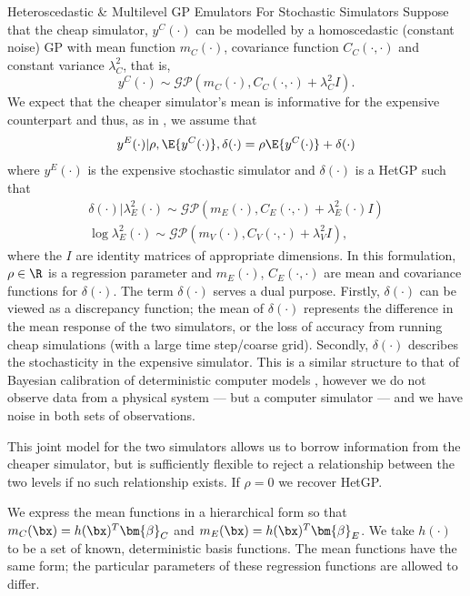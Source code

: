 \begin{chapter}{Heteroscedastic \& Multilevel GP Emulators For Stochastic Simulators\label{Ch:Hetsml}}
Suppose that the cheap simulator, $y^C(\cdot)$ can be modelled by a homoscedastic (constant noise) GP with mean function $m_C(\cdot)$, covariance function $C_C(\cdot, \cdot)$ and constant variance $\lambda^2_C$, that is,
\begin{equation}
	y^C(\cdot) \sim \mathcal{GP} \left( m_C(\cdot), C_C(\cdot, \cdot) + \lambda^2_C  I\right).
\end{equation}
We expect that the cheaper simulator's mean is informative for the expensive counterpart and thus, as in \cite{Kennedy2000}, we assume that
\begin{equation}
	y^E(\cdot)|\rho, \E\{y^C(\cdot)\}, \delta(\cdot) = \rho \E\{ y^C(\cdot) \} + \delta(\cdot)
\end{equation}
where $y^E (\cdot)$ is the expensive stochastic simulator and $\delta(\cdot)$ is a HetGP such that
\begin{align}
	\delta(\cdot)|\lambda_E^2 (\cdot) \sim \mathcal{GP}\left( m_E(\cdot), C_E(\cdot, \cdot) + \lambda^2_E(\cdot)I \right) \\
\log \lambda^2_E(\cdot) \sim \mathcal{GP} \left( m_V(\cdot), C_V (\cdot, \cdot) + \lambda_{V}^2 I \right),
\end{align}
where the $I$ are identity matrices of appropriate dimensions.
In this formulation, $\rho \in \R$ is a regression parameter and $m_E(\cdot)$, $C_E(\cdot, \cdot)$ are mean and covariance functions for $\delta(\cdot)$. The term $\delta(\cdot)$ serves a dual purpose. Firstly, $\delta(\cdot)$ can be viewed as a discrepancy function; the mean of $\delta(\cdot)$ represents the difference in the mean response of the two simulators, or the loss of accuracy from running cheap simulations (with a large time step/coarse grid). Secondly, $\delta(\cdot)$ describes the stochasticity in the expensive simulator. This is a similar structure to that of Bayesian calibration of deterministic computer models \citep{Ohagan01}, however we do not observe data from a physical system --- but a computer simulator --- and we have noise in both sets of observations.

This joint model for the two simulators allows us to borrow information from the cheaper simulator, but is sufficiently flexible to reject a relationship between the two levels if no such relationship exists. If $\rho = 0$ we recover HetGP.

We express the mean functions in a hierarchical form so that	$m_C(\bx) = h(\bx)^T \bm{\beta}_C$ and $m_E(\bx) = h(\bx)^T \bm{\beta}_E$. We take $h(\cdot)$ to be a set of known, deterministic basis functions. The mean functions have the same form; the particular parameters of these regression functions are allowed to differ.


\end{chapter}
